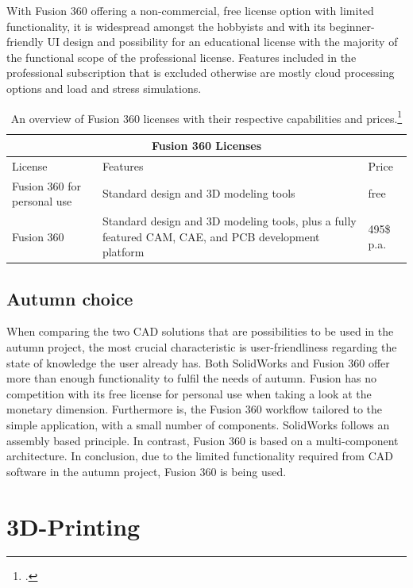 With Fusion 360 offering a non-commercial, free license option with limited functionality, it is widespread amongst the hobbyists and with its beginner-friendly UI design and possibility for an educational license with the majority of the functional scope of the professional license. Features included in the professional subscription that is excluded otherwise are mostly cloud processing options and load and stress simulations.

\begin{table}
	\centering
	\begin{tabular}{ |p{3cm}||p{6cm}|p{3cm}|  }
		\hline
		\multicolumn{3}{|c|}{Fusion 360 Licenses} \\
		\hline
		License & Features & Price\\
		\hline
		Fusion 360 for personal use& Standard design and 3D modeling tools& free\\
		\hline
		Fusion 360& Standard design and 3D modeling tools, plus a fully featured CAM, CAE, and PCB development platform& 495\$ p.a.\\
		\hline
	\end{tabular}
	\caption{An overview of Fusion 360 licenses with their respective capabilities and prices.\footcite{autodeskFusionPersonalNoDate}}
\end{table}

\subsection{Autumn choice}
When comparing the two CAD solutions that are possibilities to be used in the autumn project, the most crucial characteristic is user-friendliness regarding the state of knowledge the user already has. Both SolidWorks and Fusion 360 offer more than enough functionality to fulfil the needs of autumn. Fusion has no competition with its free license for personal use when taking a look at the monetary dimension. Furthermore is, the Fusion 360 workflow tailored to the simple application, with a small number of components. SolidWorks follows an assembly based principle. In contrast, Fusion 360 is based on a multi-component architecture.\newline
In conclusion, due to the limited functionality required from CAD software in the autumn project, Fusion 360 is being used.

\section{3D-Printing}

